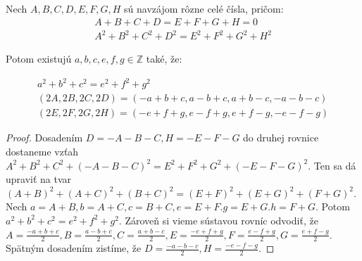 
\begin{theorem}
\label{5x5bimagic2}
Nech $A, B, C, D, E, F, G, H$ sú navzájom rôzne celé čísla, pričom:
\begin{gather}
A + B + C + D = E + F + G + H = 0 \\
A^2 + B^2 + C^2 + D^2 = E^2 + F^2 + G^2 + H^2
\end{gather}

Potom existujú $a,b,c,e,f,g \in \mathbb{Z}$ také, že:

\begin{gather}
a^2 + b^2 + c^2 = e^2 + f^2 + g^2 \\
(2A,2B,2C,2D) = (-a+b+c, a-b+c,a+b-c, -a-b-c) \\
(2E,2F,2G,2H) = (-e+f+g, e-f+g, e+f-g, -e-f-g)
\end{gather}

\end{theorem}

\begin{proof} Dosadením $D = -A-B-C, H = -E-F-G$ do druhej rovnice dostaneme vzťah $A^2 + B^2 + C^2 + (-A-B-C)^2 = E^2 + F^2 + G^2 + (-E-F-G)^2$. Ten sa dá upraviť na tvar $(A+B)^2 + (A+C)^2 + (B+C)^2 = (E+F)^2 + (E+G)^2 + (F+G)^2$. Nech $a = A+B, b = A+C, c = B+C, e = E+F. g = E+G. h = F+G$. Potom $a^2 + b^2 + c^2 = e^2 + f^2 + g^2$. Zároveň si vieme sústavou rovníc odvodiť, že $A = \frac{-a+b+c}{2}, B = \frac{a-b+c}{2}, C = \frac{a+b-c}{2}, E = \frac{-e+f+g}{2}, F = \frac{e-f+g}{2}, G = \frac{e+f-g}{2}$. Spätným dosadením zistíme, že $D = \frac{-a-b-c}{2}, H = \frac{-e-f-g}{2}$.
\end{proof}

